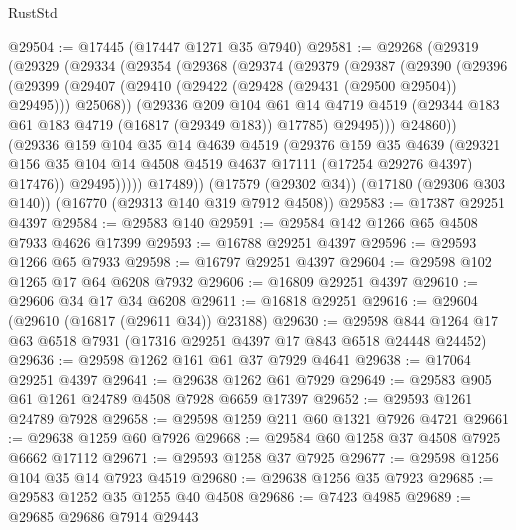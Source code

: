 \begin{lexlean}{RustStd}
\begin{coremodule}
{\begin{coremodule}
{{{{{{{{{{{{{{{{{{{{{{{{{{{{{{{{{{{{{{{{{{{{{{{{{{{{{{{@29504 := @17445 (@17447 @1271 @35 @7940)
@29581 := @29268
    (@29319
      (@29329
        (@29334
          (@29354
            (@29368
              (@29374
                (@29379
                  (@29387
                    (@29390
                      (@29396
                        (@29399
                          (@29407
                            (@29410 (@29422 (@29428 (@29431 (@29500 @29504)) @29495)))
                            @25068))
                        (@29336
                          @209
                          @104
                          @61
                          @14
                          @4719
                          @4519
                          (@29344 @183 @61 @183 @4719 (@16817 (@29349 @183)) @17785)
                          @29495)))
                    @24860))
                (@29336
                  @159
                  @104
                  @35
                  @14
                  @4639
                  @4519
                  (@29376
                    @159
                    @35
                    @4639
                    (@29321
                      @156
                      @35
                      @104
                      @14
                      @4508
                      @4519
                      @4637
                      @17111
                      (@17254 @29276 @4397)
                      @17476))
                  @29495)))))
        @17489))
    (@17579 (@29302 @34))
    (@17180 (@29306 @303 @140))
    (@16770 (@29313 @140 @319 @7912 @4508))
@29583 := @17387 @29251 @4397
@29584 := @29583 @140
@29591 := @29584 @142 @1266 @65 @4508 @7933 @4626 @17399
@29593 := @16788 @29251 @4397
@29596 := @29593 @1266 @65 @7933
@29598 := @16797 @29251 @4397
@29604 := @29598 @102 @1265 @17 @64 @6208 @7932
@29606 := @16809 @29251 @4397
@29610 := @29606 @34 @17 @34 @6208
@29611 := @16818 @29251
@29616 := @29604 (@29610 (@16817 (@29611 @34)) @23188)
@29630 := @29598 @844 @1264 @17 @63 @6518 @7931 (@17316 @29251 @4397 @17 @843 @6518 @24448 @24452)
@29636 := @29598 @1262 @161 @61 @37 @7929 @4641
@29638 := @17064 @29251 @4397
@29641 := @29638 @1262 @61 @7929
@29649 := @29583 @905 @61 @1261 @24789 @4508 @7928 @6659 @17397
@29652 := @29593 @1261 @24789 @7928
@29658 := @29598 @1259 @211 @60 @1321 @7926 @4721
@29661 := @29638 @1259 @60 @7926
@29668 := @29584 @60 @1258 @37 @4508 @7925 @6662 @17112
@29671 := @29593 @1258 @37 @7925
@29677 := @29598 @1256 @104 @35 @14 @7923 @4519
@29680 := @29638 @1256 @35 @7923
@29685 := @29583 @1252 @35 @1255 @40 @4508
@29686 := @7423 @4985
@29689 := @29685 @29686 @7914 @29443
}}}}}}}}}}}}}}}}}}}}}}}}}}}}}}}}}}}}}}}}}}}}}}}}}}}}}}}
\end{coremodule}}
\end{coremodule}
\end{lexlean}
